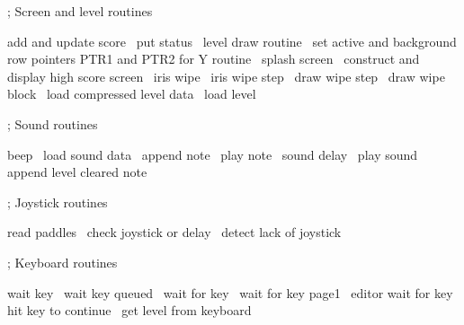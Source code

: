 \documentclass[10pt]{report}%
\begin{document}
    ; Screen and level routines

    \LA{}add and update score~{\nwtagstyle{}}\RA{}
    \LA{}put status~{\nwtagstyle{}}\RA{}
    \LA{}level draw routine~{\nwtagstyle{}}\RA{}
    \LA{}set active and background row pointers \code{}PTR1\edoc{} and \code{}PTR2\edoc{} for \code{}Y\edoc{} routine~{\nwtagstyle{}}\RA{}
    \LA{}splash screen~{\nwtagstyle{}}\RA{}
    \LA{}construct and display high score screen~{\nwtagstyle{}}\RA{}
    \LA{}iris wipe~{\nwtagstyle{}}\RA{}
    \LA{}iris wipe step~{\nwtagstyle{}}\RA{}
    \LA{}draw wipe step~{\nwtagstyle{}}\RA{}
    \LA{}draw wipe block~{\nwtagstyle{}}\RA{}
    \LA{}load compressed level data~{\nwtagstyle{}}\RA{}
    \LA{}load level~{\nwtagstyle{}}\RA{}

    ; Sound routines

    \LA{}beep~{\nwtagstyle{}}\RA{}
    \LA{}load sound data~{\nwtagstyle{}}\RA{}
    \LA{}append note~{\nwtagstyle{}}\RA{}
    \LA{}play note~{\nwtagstyle{}}\RA{}
    \LA{}sound delay~{\nwtagstyle{}}\RA{}
    \LA{}play sound~{\nwtagstyle{}}\RA{}
    \LA{}append level cleared note~{\nwtagstyle{}}\RA{}

    ; Joystick routines

    \LA{}read paddles~{\nwtagstyle{}}\RA{}
    \LA{}check joystick or delay~{\nwtagstyle{}}\RA{}
    \LA{}detect lack of joystick~{\nwtagstyle{}}\RA{}

    ; Keyboard routines

    \LA{}wait key~{\nwtagstyle{}}\RA{}
    \LA{}wait key queued~{\nwtagstyle{}}\RA{}
    \LA{}wait for key~{\nwtagstyle{}}\RA{}
    \LA{}wait for key page1~{\nwtagstyle{}}\RA{}
    \LA{}editor wait for key~{\nwtagstyle{}}\RA{}
    \LA{}hit key to continue~{\nwtagstyle{}}\RA{}
    \LA{}get level from keyboard~{\nwtagstyle{}}\RA{}
\end{document}
